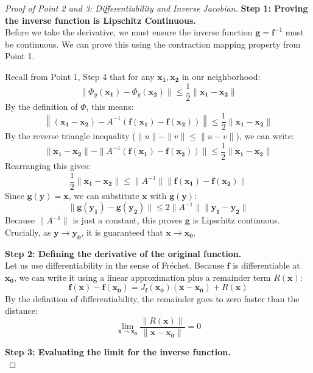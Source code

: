 \documentclass{article}
\begin{document}
\begin{proof}[Proof of Point 2 and 3: Differentiability and Inverse Jacobian]

\textbf{Step 1: Proving the inverse function is Lipschitz Continuous.} \\
Before we take the derivative, we must ensure the inverse function $\mathbf{g} = \mathbf{f}^{-1}$ must be continuous. We can prove this using the contraction mapping property from Point 1.

Recall from Point 1, Step 4 that for any $\mathbf{x_1}, \mathbf{x_2}$ in our neighborhood:
\[
    \|\Phi_y(\mathbf{x_1}) - \Phi_y(\mathbf{x_2})\| \leq \frac{1}{2} \|\mathbf{x_1} - \mathbf{x_2}\|
\]
By the definition of $\Phi$, this means:
\[
    \left\| (\mathbf{x_1} - \mathbf{x_2}) - A^{-1}(\mathbf{f}(\mathbf{x_1}) - \mathbf{f}(\mathbf{x_2})) \right\| \leq \frac{1}{2} \|\mathbf{x_1} - \mathbf{x_2}\|
\]
By the reverse triangle inequality ($\|u\| - \|v\| \leq \|u - v\|$), we can write:
\[
    \|\mathbf{x_1} - \mathbf{x_2}\| - \|A^{-1}(\mathbf{f}(\mathbf{x_1}) - \mathbf{f}(\mathbf{x_2}))\| \leq \frac{1}{2} \|\mathbf{x_1} - \mathbf{x_2}\|
\]
Rearranging this gives:
\[
    \frac{1}{2} \|\mathbf{x_1} - \mathbf{x_2}\| \leq \|A^{-1}\| \|\mathbf{f}(\mathbf{x_1}) - \mathbf{f}(\mathbf{x_2})\|
\]
Since $\mathbf{g}(\mathbf{y}) = \mathbf{x}$, we can substitute $\mathbf{x}$ with $\mathbf{g}(\mathbf{y})$:
\[
    \|\mathbf{g}(\mathbf{y_1}) - \mathbf{g}(\mathbf{y_2})\| \leq 2\|A^{-1}\| \|\mathbf{y_1} - \mathbf{y_2}\|
\]
Because $\|A^{-1}\|$ is just a constant, this proves $\mathbf{g}$ is Lipschitz continuous. Crucially, as $\mathbf{y} \to \mathbf{y_0}$, it is guaranteed that $\mathbf{x} \to \mathbf{x_0}$.

\textbf{Step 2: Defining the derivative of the original function.} \\

Let us use differentiability in the sense of Fréchet.
Because $\mathbf{f}$ is differentiable at $\mathbf{x_0}$, we can write it using a linear approximation plus a remainder term $R(\mathbf{x})$:
\[
    \mathbf{f}(\mathbf{x}) - \mathbf{f}(\mathbf{x_0}) = J_{\mathbf{f}}(\mathbf{x_0})(\mathbf{x} - \mathbf{x_0}) + R(\mathbf{x})
\]
By the definition of differentiability, the remainder goes to zero faster than the distance:
\[
    \lim_{\mathbf{x} \to \mathbf{x_0}} \frac{\|R(\mathbf{x})\|}{\|\mathbf{x} - \mathbf{x_0}\|} = 0
\]

\textbf{Step 3: Evaluating the limit for the inverse function.} \\


\end{proof}
\end{document}
